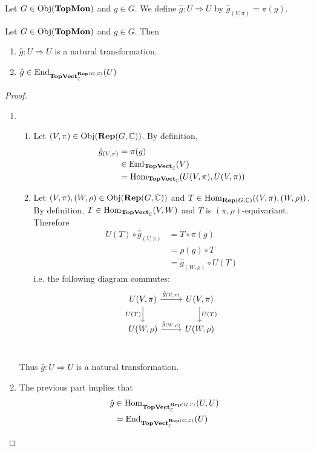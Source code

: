 \documentclass{book}
\begin{document}
	\begin{defn}
		Let $G \in \operatorname{Obj}(\operatorname*{\text{\textbf{TopMon}}})$ and $g \in G$. We define $\hat{g}: U \Rightarrow U$ by $\hat{g}_{(V, \pi)} = \pi(g)$. 
	\end{defn}

	\begin{ex}
		Let $G \in \operatorname{Obj}(\operatorname*{\text{\textbf{TopMon}}})$ and $g \in G$. Then 
		\begin{enumerate}
			\item $\hat{g}: U \Rightarrow U$ is a natural transformation.
			\item $\hat{g} \in \operatorname{\text{End}}_{\operatorname*{\text{\textbf{TopVect}}}_{\mathbb{C}}^{\operatorname*{\text{\textbf{Rep}}}(G, \mathbb{C})}}(U)$
		\end{enumerate}
	\end{ex}

	\begin{proof}\
		\begin{enumerate}
			\item \begin{enumerate}
				\item Let $(V, \pi) \in \operatorname{Obj}(\operatorname*{\text{\textbf{Rep}}}(G, \mathbb{C}))$. By definition,  
				\begin{align*}
					\hat{g}_{(V, \pi)}
					& = \pi(g) \\
					& \in \operatorname{\text{End}}_{\operatorname*{\text{\textbf{TopVect}}}_{\mathbb{C}}}(V) \\
					& = \operatorname{Hom}_{\operatorname*{\text{\textbf{TopVect}}}_{\mathbb{C}}}(U(V, \pi), U(V, \pi))
				\end{align*}
				\item Let $(V, \pi), (W, \rho) \in \operatorname{Obj}(\operatorname*{\text{\textbf{Rep}}}(G, \mathbb{C}))$ and $T \in \operatorname{Hom}_{\operatorname*{\text{\textbf{Rep}}}(G, \mathbb{C})}((V, \pi), (W, \rho))$. By definition, $T \in \operatorname{Hom}_{\operatorname*{\text{\textbf{TopVect}}}_{\mathbb{C}}}(V, W)$ and $T$ is $(\pi, \rho)$-equivariant. Therefore
				\begin{align*}
					U(T) \circ \hat{g}_{(V, \pi)}
					& = T \circ \pi(g) \\
					& = \rho(g) \circ T \\
					& = \hat{g}_{(W, \rho)} \circ U(T) 
				\end{align*}
				i.e. the following diagram commutes: 
				\[ 
				\begin{tikzcd}
					U(V, \pi)  \arrow[r, "\hat{g}_{(V,\pi)}"]  \arrow[d, "U(T)"']  & U(V, \pi)   \arrow[d, "U(T)"]\\
					U(W, \rho) \arrow[r, "\hat{g}_{(W, \rho)}"] &  U(W, \rho) \\
				\end{tikzcd}
				\]
			\end{enumerate}
			Thus $\hat{g}: U \Rightarrow U$ is a natural transformation. 
			\item The previous part implies that  
			\begin{align*}
				\hat{g} 
				& \in \operatorname{Hom}_{\operatorname*{\text{\textbf{TopVect}}}_{\mathbb{C}}^{\operatorname*{\text{\textbf{Rep}}}(G, \mathbb{C})}}(U, U) \\
				& = \operatorname{\text{End}}_{\operatorname*{\text{\textbf{TopVect}}}_{\mathbb{C}}^{\operatorname*{\text{\textbf{Rep}}}(G, \mathbb{C})}}(U)
			\end{align*} 
		\end{enumerate}
	\end{proof}
	
\end{document}
